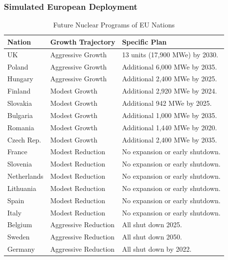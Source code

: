 \begin{frame}
	\frametitle{Simulated European Deployment}
	
\begin{table}[h]
	\centering
	\begin{adjustbox}{max totalsize={1.1\textwidth}{.8\textheight}, center}
				\begin{tabularx}{\textwidth}{lmb}
					\hline 
					
					\textbf{Nation} & \textbf{Growth Trajectory} & \textbf{Specific Plan }\\
					\hline
					UK & Aggressive Growth & {\small  13 units (17,900 MWe) by 2030.}\\
					\hline
					Poland & Aggressive Growth &  {\small Additional 6,000 MWe by 2035.}\\
					\hline
					Hungary & Aggressive Growth &  {\small Additional 2,400 MWe by 2025.} \\ 
					\hline
					Finland & Modest Growth &  {\small Additional 2,920 MWe by 2024.}\\
					\hline
					Slovakia & Modest Growth & {\small Additional 942 MWe by 2025.}\\
					\hline
					Bulgaria & Modest Growth &  {\small Additional 1,000 MWe by 2035.} \\
					\hline
					Romania & Modest Growth &  {\small Additional 1,440 MWe by 2020.} \\
					\hline
					Czech Rep. & Modest Growth & {\small  Additional 2,400 MWe by 2035.}\\
					\hline
					France & Modest Reduction & {\small No expansion or early shutdown.}\\
					\hline
					Slovenia & Modest Reduction & {\small No expansion or early shutdown.}\\
					\hline
					Netherlands & Modest Reduction & {\small No expansion or early shutdown.}\\
					\hline
					Lithuania & Modest Reduction & {\small No expansion or early shutdown.}\\
					\hline 
					Spain & Modest Reduction &  {\small No expansion or early shutdown.} \\
					\hline
					Italy & Modest Reduction & {\small No expansion or early shutdown. }\\
					\hline
					Belgium & Aggressive Reduction & All shut down 2025.\\
					\hline
					Sweden & Aggressive Reduction & All shut down 2050.\\
					\hline
					Germany & Aggressive Reduction & All shut down by 2022.\\
					\hline
					
				\end{tabularx}
	\end{adjustbox}
	\caption {Future Nuclear Programs of \gls{EU} Nations \cite{world_nuclear_association_nuclear_2017}}
  \label{tab:eu_growth}
\end{table}
\end{frame}




